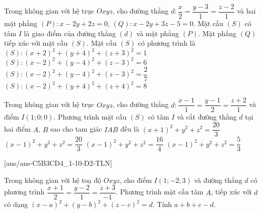 \begin{ex}%
	Trong không gian với hệ trục $Oxyz$, cho đường thẳng $d\colon\dfrac{x}{2}=\dfrac{y-3}{1}=\dfrac{z-2}{1}$ và hai mặt phẳng $(P)\colon x-2 y+2 z=0$, $(Q)\colon x-2 y+3 z-5=0$. Mặt cầu $(S)$ có tâm $I$ là giao điểm của đường thẳng $(d)$ và mặt phẳng $(P)$. Mặt phẳng $(Q)$ tiếp xúc với mặt cầu $(S)$. Mặt cầu $(S)$ có phương trình là
	\choice 	
		{$(S)\colon(x+2)^2+(y+4)^2+(z+3)^2=1$}
		{$(S)\colon(x-2)^2+(y-4)^2+(z-3)^2=6$}
		{\True $(S)\colon(x-2)^2+(y-4)^2+(z-3)^2=\dfrac{2}{7}$}
		{$(S)\colon(x-2)^2+(y+4)^2+(z+4)^2=8$}
\end{ex}

\begin{ex}%
	Trong không gian với hệ trục $Oxyz$, cho  đường thẳng $d\colon \dfrac{x-1}{1}=\dfrac{y-1}{2}=\dfrac{z+2}{1}$ và điểm $I(1;0;0)$. Phương trình mặt cầu $(S)$ có tâm $I$ và cắt đường thẳng $d$ tại hai điểm $A$, $B$ sao cho tam giác $IAB$ đều là
	\choice 
		{\True $(x+1)^2+y^2+z^2=\dfrac{20}{3}$}
		{$(x-1)^2+y^2+z^2=\dfrac{20}{3}$}
		{$(x-1)^2+y^2+z^2=\dfrac{16}{4}$}
		{$(x-1)^2+y^2+z^2=\dfrac{5}{3}$}
\end{ex}

\TNSA
{}[ans/ans-C5B3CD4_1-10-D2-TLN]
\begin{ex}%
	Trong không gian với hệ toạ độ $Oxyz$, cho điểm $I(1;-2;3)$ và đường thẳng $d$ có phương trình $\dfrac{x+1}{2}=\dfrac{y-2}{1}=\dfrac{z+3}{-1}$. Phương trình mặt cầu tâm $A$, tiếp xúc với $d$ có dạng $(x-a)^2+(y-b)^2+(z-c)^2=d$. Tính $a+b+c-d$.
\end{ex}

